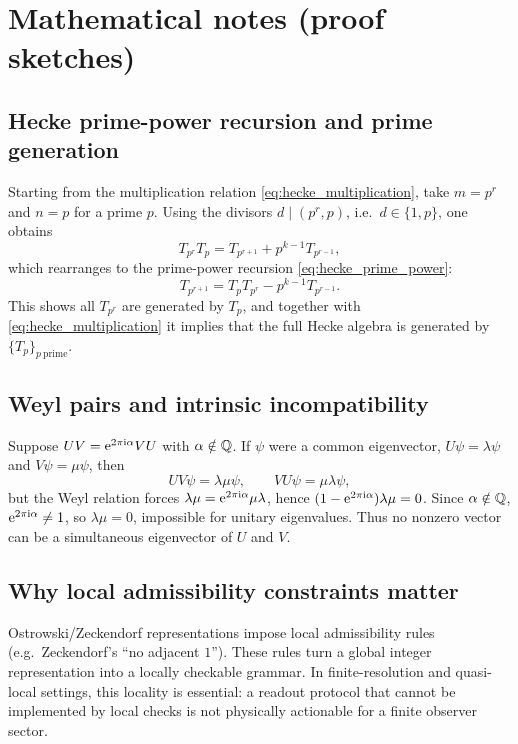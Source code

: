 \section{Mathematical notes (proof sketches)}
\label{app:math_notes}

\subsection{Hecke prime-power recursion and prime generation}
\label{app:hecke_recursion}

Starting from the multiplication relation \eqref{eq:hecke_multiplication}, take $m=p^r$ and $n=p$ for a prime $p$. Using the divisors $d\mid (p^r,p)$, i.e.\ $d\in\{1,p\}$, one obtains
\begin{equation}
T_{p^r}T_p = T_{p^{r+1}} + p^{k-1}T_{p^{r-1}},
\end{equation}
which rearranges to the prime-power recursion \eqref{eq:hecke_prime_power}:
\begin{equation}
T_{p^{r+1}} = T_p T_{p^r} - p^{k-1}T_{p^{r-1}}.
\end{equation}
This shows all $T_{p^r}$ are generated by $T_p$, and together with \eqref{eq:hecke_multiplication} it implies that the full Hecke algebra is generated by $\{T_p\}_{p\ \mathrm{prime}}$.

\subsection{Weyl pairs and intrinsic incompatibility}
\label{app:weyl_incompatibility}

Suppose $UV=\mathrm{e}^{2\pi\mathrm{i}\alpha}VU$ with $\alpha\notin\mathbb{Q}$. If $\psi$ were a common eigenvector, $U\psi=\lambda\psi$ and $V\psi=\mu\psi$, then
\begin{equation}
UV\psi = \lambda\mu \psi,\qquad VU\psi=\mu\lambda\psi,
\end{equation}
but the Weyl relation forces $\lambda\mu = \mathrm{e}^{2\pi\mathrm{i}\alpha}\mu\lambda$, hence $(1-\mathrm{e}^{2\pi\mathrm{i}\alpha})\lambda\mu=0$. Since $\alpha\notin\mathbb{Q}$, $\mathrm{e}^{2\pi\mathrm{i}\alpha}\ne 1$, so $\lambda\mu=0$, impossible for unitary eigenvalues. Thus no nonzero vector can be a simultaneous eigenvector of $U$ and $V$.

\subsection{Why local admissibility constraints matter}
\label{app:local_constraints}

Ostrowski/Zeckendorf representations impose local admissibility rules (e.g.\ Zeckendorf's ``no adjacent $1$''). These rules turn a global integer representation into a locally checkable grammar. In finite-resolution and quasi-local settings, this locality is essential: a readout protocol that cannot be implemented by local checks is not physically actionable for a finite observer sector.


